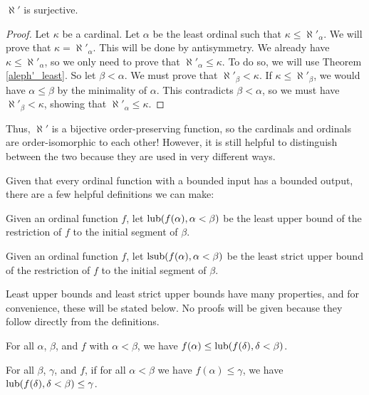 \documentclass[../../math.tex]{subfiles}
\begin{document}
\begin{instance}
    $\aleph'$ is surjective.
\end{instance}
\begin{proof}
    Let $\kappa$ be a cardinal.  Let $\alpha$ be the least ordinal such that
    $\kappa \leq \aleph'_\alpha$.  We will prove that $\kappa =
    \aleph'_\alpha$.  This will be done by antisymmetry.  We already have
    $\kappa \leq \aleph'_\alpha$, so we only need to prove that $\aleph'_\alpha
    \leq \kappa$.  To do so, we will use Theorem \ref{aleph'_least}.  So let
    $\beta < \alpha$.  We must prove that $\aleph'_\beta < \kappa$.  If $\kappa
    \leq \aleph'_\beta$, we would have $\alpha \leq \beta$ by the minimality of
    $\alpha$.  This contradicts $\beta < \alpha$, so we must have $\aleph'_\beta
    < \kappa$, showing that $\aleph'_\alpha \leq \kappa$.
\end{proof}

Thus, $\aleph'$ is a bijective order-preserving function, so the cardinals and
ordinals are order-isomorphic to each other!  However, it is still helpful to
distinguish between the two because they are used in very different ways.

Given that every ordinal function with a bounded input has a bounded output,
there are a few helpful definitions we can make:

\begin{definition}
    Given an ordinal function $f$, let $\operatorname{lub}(f(\alpha), \alpha < \beta)$ be the
    least upper bound of the restriction of $f$ to the initial segment of
    $\beta$.
\end{definition}

\begin{definition}
    Given an ordinal function $f$, let $\operatorname{lsub}(f(\alpha), \alpha < \beta)$ be the
    least strict upper bound of the restriction of $f$ to the initial segment of
    $\beta$.
\end{definition}

Least upper bounds and least strict upper bounds have many properties, and for
convenience, these will be stated below.  No proofs will be given because they
follow directly from the definitions.

\begin{theorem} \label{ord_lub_ge}
    For all $\alpha$, $\beta$, and $f$ with $\alpha < \beta$, we have $f(\alpha)
    \leq \operatorname{lub}(f(\delta), \delta < \beta)$.
\end{theorem}

\begin{theorem} \label{ord_lub_least}
    For all $\beta$, $\gamma$, and $f$, if for all $\alpha < \beta$ we have
    $f(\alpha) \leq \gamma$, we have $\operatorname{lub}(f(\delta), \delta < \beta) \leq
    \gamma$.
\end{theorem}
\end{document}
